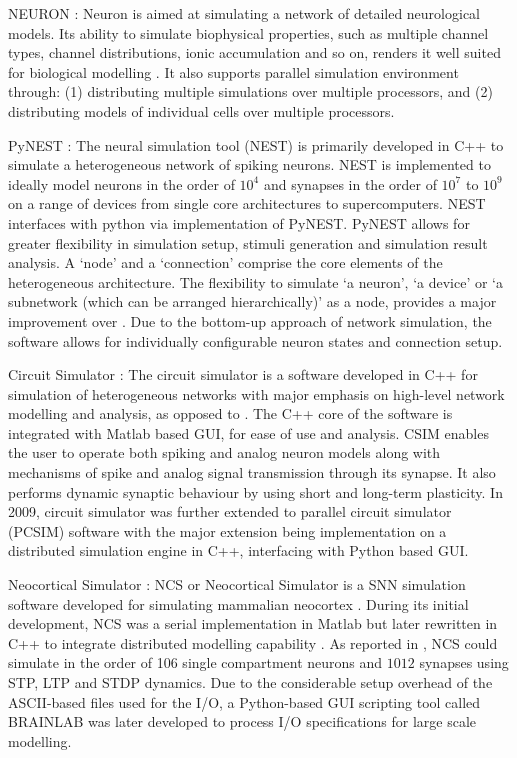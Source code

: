 NEURON \citep{hines1997neuron}: Neuron is aimed at simulating a network of detailed neurological models. Its ability to simulate biophysical properties, such as multiple channel types, channel distributions, ionic accumulation and so on, renders it well suited for biological modelling \citep{brette2007simulation}. It also supports parallel simulation environment through: (1) distributing multiple simulations over multiple processors, and (2) distributing models of individual cells over multiple processors.

PyNEST \citep{eppler2008pynest}: The neural simulation tool (NEST) is primarily developed in C++ to simulate a heterogeneous network of spiking neurons. NEST is implemented to ideally model neurons in the order of $10^4$ and synapses in the order of $10^7$ to $10^9$ on a range of devices from single core architectures to supercomputers. NEST interfaces with python via implementation of PyNEST. PyNEST allows for greater flexibility in simulation setup, stimuli generation and simulation result analysis. A `node' and a `connection' comprise the core elements of the heterogeneous architecture. The flexibility to simulate `a neuron', `a device' or `a subnetwork (which can be arranged hierarchically)' as a node, provides a major improvement over \citep{pecevski2009pcsim}. Due to the bottom-up approach of network simulation, the software allows for individually configurable neuron states and connection setup. 

Circuit Simulator \citep{natschlager2003computer}: The circuit simulator is a software developed in C++ for simulation of heterogeneous networks with major emphasis on high-level network modelling and analysis, as opposed to \citep{hines1997neuron}. The C++ core of the software is integrated with Matlab based GUI, for ease of use and analysis. CSIM enables the user to operate both spiking and analog neuron models along with mechanisms of spike and analog signal transmission through its synapse. It also performs dynamic synaptic behaviour by using short and long-term plasticity. In 2009, circuit simulator was further extended to parallel circuit simulator (PCSIM) software with the major extension being implementation on a distributed simulation engine in C++, interfacing with Python based GUI.

Neocortical Simulator \citep{drewes2005brainlab}: NCS or Neocortical Simulator is a SNN simulation software developed for simulating mammalian neocortex \citep{brette2007simulation}. During its initial development, NCS was a serial implementation in Matlab but later rewritten in C++ to integrate distributed modelling capability \citep{wilson2001parallel}. As reported in \citep{brette2007simulation}, NCS could simulate in the order of 106 single compartment neurons and $1012$ synapses using STP, LTP and STDP dynamics. Due to the considerable setup overhead of the ASCII-based files used for the I/O, a Python-based GUI scripting tool called BRAINLAB \citep{drewes2005brainlab} was later developed to process I/O specifications for large scale modelling.

